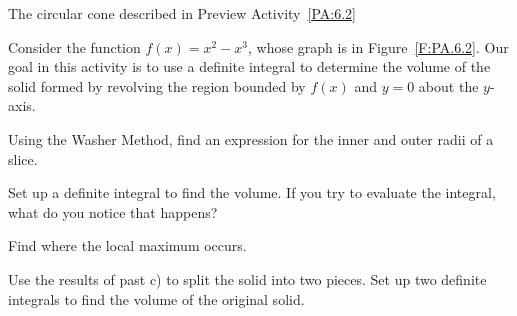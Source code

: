 \begin{marginfigure}[8cm] %
\caption{The circular cone described in Preview Activity~\ref{PA:6.2}} \label{F:PA.6.2}
\end{marginfigure}

\begin{pa} \label{PA:6.2}  Consider the function $f(x)=x^2-x^3$, whose graph is in Figure~\ref{F:PA.6.2}.  Our goal in this activity is to use a definite integral to determine the volume of the solid formed by revolving the region bounded by $f(x)$ and $y=0$ about the $y$-axis.

\ba
\item Using the Washer Method, find an expression for the inner and outer radii of a slice.
\item Set up a definite integral to find the volume. If you try to evaluate the integral, what do you notice that happens? 
\item Find where the local maximum occurs.  
\item Use the results of past c) to split the solid into two pieces. Set up two definite integrals to find the volume of the original solid.  
	
\ea
\end{pa} 
\afterpa